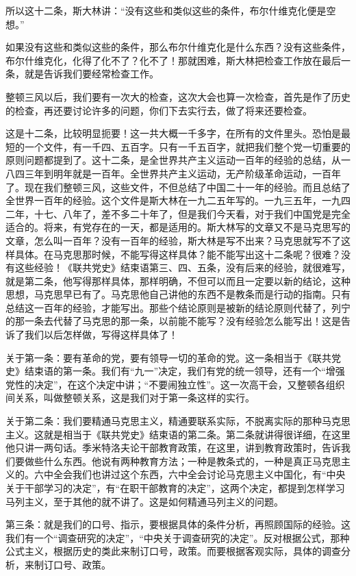 所以这十二条，斯大林讲：“没有这些和类似这些的条件，布尔什维克化便是空想。”

如果没有这些和类似这些的条件，那么布尔什维克化是什么东西？没有这些条件，布尔什维克化，化得了化不了？化不了！那就困难，斯大林把检查工作放在最后一条，就是告诉我们要经常检查工作。

整顿三风以后，我们要有一次大的检查，这次大会也算一次检查，首先是作了历史的检查，再还要讨论许多的问题，你们下去实行去，做了将来还要检查。

这是十二条，比较明显扼要！这一共大概一千多字，在所有的文件里头。恐怕是最短的一个文件，有一千四、五百字。只有一千五百字，就把我们整个党一切重要的原则问题都提到了。这十二条，是全世界共产主义运动一百年的经验的总结，从一八四三年到明年就是一百年。全世界共产主义运动，无产阶级革命运动，一百年了。现在我们整顿三风，这些文件，不但总结了中国二十一年的经验。而且总结了全世界一百年的经验。这个文件是斯大林在一九二五年写的。一九三五年，一九四二年，十七、八年了，差不多二十年了，但是我们今天看，对于我们中国党是完全适合的。将来，有党存在的一天，都是适用的。斯大林写的文章又不是马克思写的文章，怎么叫一百年？没有一百年的经验，斯大林是写不出来？马克思就写不了这样具体。在马克思那时候，不能写得这样具体？能不能写出这十二条呢？很难？没有这些经验！《联共党史》结束语第三、四、五条，没有后来的经验，就很难写，就是第二条，他写得那样具体，那样明确，不但可以而且一定要以新的结论，这种思想，马克思早已有了。马克思他自己讲他的东西不是教条而是行动的指南。只有总结这一百年的经验，才能写出。那些个结论原则是被新的结论原则代替了，列宁的那一条去代替了马克思的那一条，以前能不能写？没有经验怎么能写出！这是告诉了我们以后怎样做，写得这样具体了！

关于第一条：要有革命的党，要有领导一切的革命的党。这一条相当于《联共党史》结束语的第一条。我们有“九一”决定，我们有党的统一领导，还有一个“增强党性的决定”，在这个决定中讲；“不要闹独立性”。这一次高干会，又整顿各组织间关系，叫做整顿关系，这是我们对于第一条这样的实行。

关于第二条：我们要精通马克思主义，精通要联系实际，不脱离实际的那种马克思主义。这就是相当于《联共党史》结束语的第二条。第二条就讲得很详细，在这里他只讲一两句话。季米特洛夫论干部教育政策，在这里，讲到教育政策时，告诉我们要做些什么东西。他说有两种教育方法；一种是教条式的，一种是真正马克思主义的。六中全会我们也讲过这个东西，六中全会讨论马克思主义中国化，有“中央关于干部学习的决定”，有“在职干部教育的决定”，这两个决定，都提到怎样学习马列主义，至于其他的就不讲了。这是如何精通马列主义的问题。

第三条：就是我们的口号、指示，要根据具体的条件分析，再照顾国际的经验。这我们有一个“调查研究的决定”，“中央关于调查研究的决定”。反对根据公式，那种公式主义，根据历史的类此来制订口号，政策。而要根据客观实际，具体的调查分析，来制订口号、政策。

